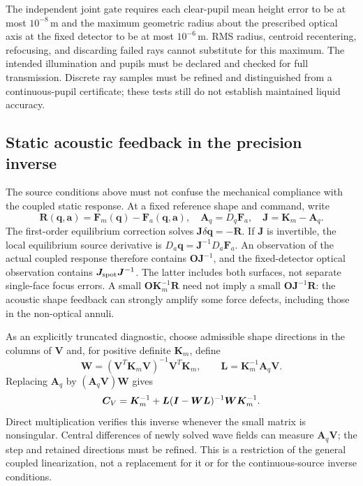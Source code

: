 The independent joint gate requires each clear-pupil mean height error to be
at most $10^{-8}\,\mathrm m$ and the maximum geometric radius about the
prescribed optical axis at the fixed detector to be at most
$10^{-6}\,\mathrm m$. RMS radius, centroid recentering, refocusing, and
discarding failed rays cannot substitute for this maximum. The intended
illumination and pupils must be declared and checked for full transmission.
Discrete ray samples must be refined and distinguished from a continuous-pupil
certificate; these tests still do not establish maintained liquid accuracy.

\subsection{Static acoustic feedback in the precision inverse}
The source conditions above must not confuse the mechanical compliance with
the coupled static response. At a fixed reference shape and command, write
\[
 \bm R(\bm q,\bm a)=\bm F_m(\bm q)-\bm F_a(\bm q,\bm a),\quad
 \bm A_q=D_q\bm F_a,\quad
 \bm J=\bm K_m-\bm A_q.
\]
The first-order equilibrium correction solves
$\bm J\delta\bm q=-\bm R$. If $\bm J$ is invertible, the local equilibrium
source derivative is $D_a\bm q=\bm J^{-1}D_a\bm F_a$.
An observation of the actual coupled response therefore contains
$\bm O\bm J^{-1}$, and the fixed-detector optical observation contains
$\bm J_{\rm spot}\bm J^{-1}$. The latter includes both surfaces, not
separate single-face focus errors. A small
$\bm O\bm K_m^{-1}\bm R$ need not imply a small
$\bm O\bm J^{-1}\bm R$: the acoustic shape feedback can strongly amplify
some force defects, including those in the non-optical annuli.

As an explicitly truncated diagnostic, choose admissible shape directions
in the columns of $\bm V$ and, for positive definite $\bm K_m$, define
\[
 \bm W=(\bm V^T\bm K_m\bm V)^{-1}\bm V^T\bm K_m,
 \qquad \bm L=\bm K_m^{-1}\bm A_q\bm V.
\]
Replacing $\bm A_q$ by $(\bm A_q\bm V)\bm W$ gives
\begin{equation}
 \bm C_V=\bm K_m^{-1}
 +\bm L(\bm I-\bm W\bm L)^{-1}\bm W\bm K_m^{-1}.
\end{equation}
Direct multiplication verifies this inverse whenever the small matrix is
nonsingular. Central differences of newly solved wave fields can measure
$\bm A_q\bm V$; the step and retained directions must be refined.
This is a restriction of the general coupled linearization, not a replacement
for it or for the continuous-source inverse conditions.

